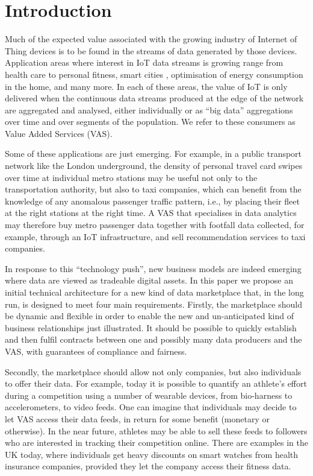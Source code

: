\documentclass[chi_draft]{sigchi}
\begin{document}
\section{Introduction}
Much of the expected value associated with the growing industry of Internet of Thing devices \cite{7004800} is to be found in the streams of data generated by those devices.
Application areas where interest in IoT data streams is growing range from health care \cite{7113786} to personal fitness, smart cities \cite{Perera2014}, optimisation of energy consumption in the home, and many more.
In each of these areas, the value of IoT is only delivered when the continuous data streams produced at the edge of the network are aggregated and analysed, either individually or as ``big data'' aggregations over time and over segments of the population.  We refer to these consumers as Value Added Services (VAS).

Some of these applications are just emerging.
For example, in a public transport network like the London underground, the density of personal travel card swipes over time at individual metro stations may be
useful not only to the transportation authority, but also to taxi companies, which can benefit from the knowledge of any anomalous passenger traffic pattern, i.e., by placing their fleet at the right stations at the right time. A VAS that specialises in data analytics may therefore buy metro passenger data together with footfall data collected, for example, through an IoT infrastructure, and sell
recommendation services to taxi companies.

In response to this ``technology push'', new business models are indeed emerging \cite{Stahl2016,7765669} where data are viewed as tradeable digital assets. 
In this paper we propose an initial technical architecture for a new kind of data marketplace that, in the long run, is designed to meet four main requirements.
Firstly, the marketplace should be dynamic and flexible in order to enable the new and un-anticipated kind of business relationships just illustrated. It should be possible to quickly  establish and then fulfil contracts between one and possibly many data producers and the VAS, with guarantees of compliance and fairness.

Secondly, the marketplace should allow not only companies, but also individuals to offer their data. 
%
For example, today it is possible to quantify an athlete's effort during a competition using a number of wearable devices, from bio-harness to accelerometers, to video feeds.
One can imagine that individuals may decide to let VAS access their data feeds, in return for some benefit (monetary or otherwise).
In the near future, athletes may be able to sell these feeds to followers who are interested in tracking their competition online.
There are examples in the UK today, where individuals get heavy discounts on smart watches from health insurance companies, provided they let the company access their fitness data.
\end{document}
